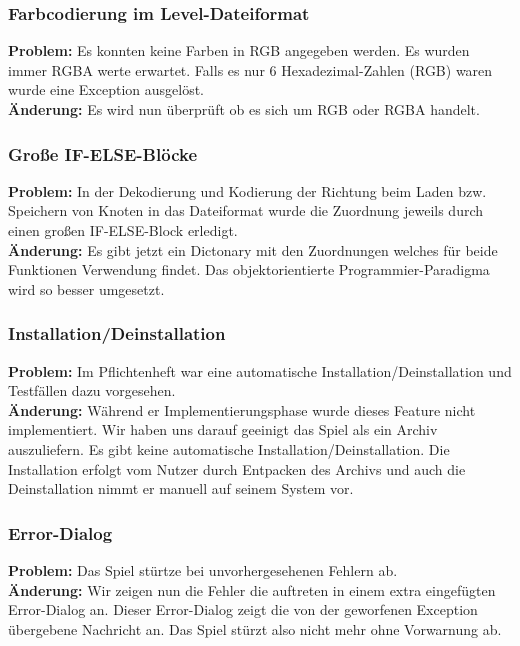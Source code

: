 
\subsubsection*{Farbcodierung im Level-Dateiformat}

\textbf{Problem:}
Es konnten keine Farben in RGB angegeben werden. Es wurden immer RGBA werte erwartet.
Falls es nur 6 Hexadezimal-Zahlen (RGB) waren wurde eine Exception ausgelöst.\\

\textbf{Änderung:} Es wird nun überprüft ob es sich um RGB oder RGBA handelt.\\



\subsubsection*{Große IF-ELSE-Blöcke}
\textbf{Problem:}
In der Dekodierung und Kodierung der Richtung beim Laden bzw. Speichern von Knoten in das Dateiformat wurde die Zuordnung jeweils durch einen großen IF-ELSE-Block erledigt.\\

\textbf{Änderung:} Es gibt jetzt ein Dictonary mit den Zuordnungen welches für beide Funktionen Verwendung findet. Das objektorientierte Programmier-Paradigma wird so besser umgesetzt.\\



\subsubsection*{Installation/Deinstallation}
\textbf{Problem:} Im Pflichtenheft war eine automatische Installation/Deinstallation und Testfällen dazu vorgesehen.\\

\textbf{Änderung:} Während er Implementierungsphase wurde dieses Feature nicht implementiert. Wir haben uns darauf geeinigt das Spiel als ein Archiv auszuliefern. Es gibt keine automatische Installation/Deinstallation. Die Installation erfolgt vom Nutzer durch Entpacken des Archivs und auch die Deinstallation nimmt er manuell auf seinem System vor.\\


\subsubsection*{Error-Dialog}
\textbf{Problem:} Das Spiel stürtze bei unvorhergesehenen Fehlern ab.\\

\textbf{Änderung:} Wir zeigen nun die Fehler die auftreten in einem extra eingefügten Error-Dialog an. Dieser Error-Dialog zeigt die von der geworfenen Exception übergebene Nachricht an. Das Spiel stürzt also nicht mehr ohne Vorwarnung ab.\\

